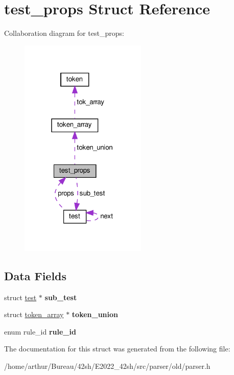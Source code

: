 \hypertarget{structtest__props}{}\section{test\+\_\+props Struct Reference}
\label{structtest__props}


Collaboration diagram for test\+\_\+props\+:
\nopagebreak
\begin{figure}[H]
\begin{center}
\leavevmode
\includegraphics[width=171pt]{structtest__props__coll__graph}
\end{center}
\end{figure}
\subsection*{Data Fields}
\begin{DoxyCompactItemize}
\item 
\mbox{\label{structtest__props_af109b264271608caf250960df108e415}} 
struct \hyperlink{structtest}{test} $\ast$ {\bfseries sub\+\_\+test}
\item 
\mbox{\label{structtest__props_a3fe7707c967e00219b7eb3d3b16b8e20}} 
struct \hyperlink{structtoken__array}{token\+\_\+array} $\ast$ {\bfseries token\+\_\+union}
\item 
\mbox{\label{structtest__props_a7fc88fb764d00007bd9536355e1457ca}} 
enum rule\+\_\+id {\bfseries rule\+\_\+id}
\end{DoxyCompactItemize}


The documentation for this struct was generated from the following file\+:\begin{DoxyCompactItemize}
\item 
/home/arthur/\+Bureau/42sh/\+E2022\+\_\+42sh/src/parser/old/parser.\+h\end{DoxyCompactItemize}

